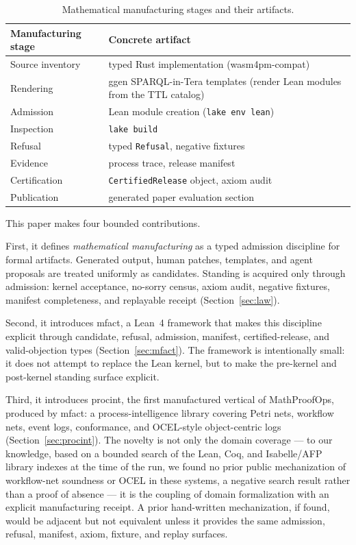 \documentclass[11pt]{article}
\begin{document}
\begin{table}[h]
\centering
\small
\begin{tabular}{ll}
\toprule
Manufacturing stage & Concrete artifact \\
\midrule
Source inventory & typed Rust implementation (wasm4pm-compat) \\
Rendering & \textsf{ggen} SPARQL-in-Tera templates (render Lean modules from the TTL catalog) \\
Admission & Lean module creation (\texttt{lake env lean}) \\
Inspection & \texttt{lake build} \\
Refusal & typed \texttt{Refusal}, negative fixtures \\
Evidence & process trace, release manifest \\
Certification & \texttt{CertifiedRelease} object, axiom audit \\
Publication & generated paper evaluation section \\
\bottomrule
\end{tabular}
\caption{Mathematical manufacturing stages and their artifacts.}
\label{tab:stages}
\end{table}

This paper makes four bounded contributions.

First, it defines \emph{mathematical manufacturing} as a typed admission
discipline for formal artifacts. Generated output, human patches,
templates, and agent proposals are treated uniformly as candidates.
Standing is acquired only through admission: kernel acceptance, no-sorry
census, axiom audit, negative fixtures, manifest completeness, and
replayable receipt (Section~\ref{sec:law}).

Second, it introduces \textsf{mfact}, a Lean~4 framework that makes this
discipline explicit through candidate, refusal, admission, manifest,
certified-release, and valid-objection types (Section~\ref{sec:mfact}).
The framework is intentionally small: it does not attempt to replace the
Lean kernel, but to make the pre-kernel and post-kernel standing surface
explicit.

Third, it introduces \textsf{procint}, the first manufactured vertical of
MathProofOps, produced by \textsf{mfact}: a process-intelligence library
covering Petri nets, workflow nets, event logs, conformance, and
OCEL-style object-centric logs (Section~\ref{sec:procint}). The novelty is
not only the domain coverage --- to our knowledge, based on a bounded
search of the Lean, Coq, and Isabelle/AFP library indexes at the time of
the run, we found no prior public mechanization of workflow-net soundness
or OCEL in these systems, a negative search result rather than a proof of
absence --- it is the coupling of domain formalization with an explicit
manufacturing receipt. A prior hand-written mechanization, if found, would
be adjacent but not equivalent unless it provides the same admission,
refusal, manifest, axiom, fixture, and replay surfaces.
\end{document}
